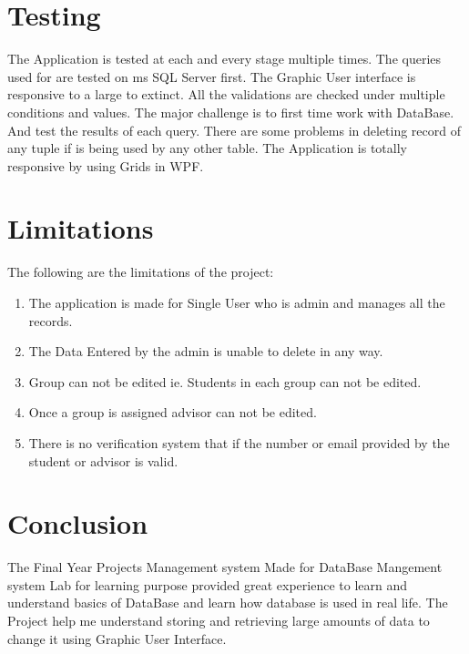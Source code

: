 \documentclass[a4paper, 12pt, oneside]{uet_thesis}
\begin{document}
\chapter{Testing}
The Application is tested at each and every stage multiple times. The queries used for are tested on ms SQL Server first. The Graphic User interface is responsive to a large to extinct. All the validations are checked under multiple conditions and values. The major challenge is to first time work with DataBase. And test the results of each query. There are some problems in deleting record of any tuple if is being used by any other table. The Application is totally responsive by using Grids in WPF.

\clearpage

\chapter{Limitations}
The following are the limitations of the project:
\begin{enumerate}
    \item The application is made for Single User who is admin and manages all the records.
    \item The Data Entered by the admin is unable to delete in any way.
    \item Group can not be edited ie. Students in each group can not be edited.
    \item Once a group is assigned advisor can not be edited.
    \item There is no verification system that if the number or email provided by the student or advisor is valid.
\end{enumerate}
\clearpage

\chapter{Conclusion}
The Final Year Projects Management system Made for DataBase Mangement system Lab for learning purpose provided great experience to learn and understand basics of DataBase and learn how database is used in real life. The Project help me understand storing and retrieving large amounts of data to change it using Graphic User Interface.
\end{document}
